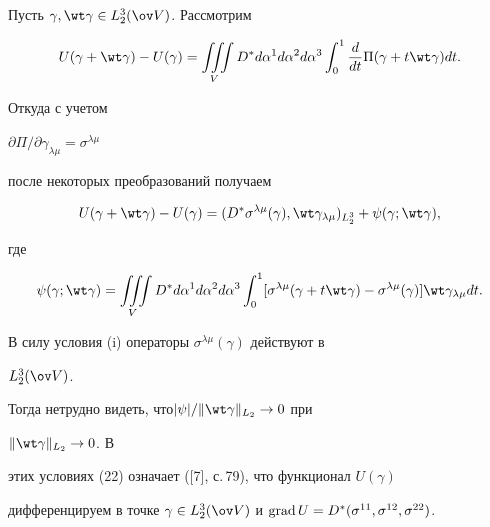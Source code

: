 \begin{pf} 


Пусть $\gamma,\wt\gamma\in L^3_2(\ov V)$. Рассмотрим 


$$ 


U(\gamma+\wt\gamma)-U(\gamma)=\iiint\limits_V 


D^* d\alpha^1d\alpha^2d\alpha^3 \int^1_0\frac{d}{d t} 


\Pi(\gamma+t\wt\gamma)d t. 


$$ 


Откуда с учетом 


$\partial\Pi/\partial\gamma_{\lambda\mu}=\sigma^{\lambda\mu}$ 


после некоторых преобразований получаем 


\begin{equation} 


U(\gamma+\wt\gamma)-U(\gamma)=(D^*\sigma^{\lambda\mu}(\gamma), 


\wt\gamma_{\lambda\mu})_{L^3_2}+\psi(\gamma;\wt\gamma), 


\end{equation} 


где 


$$ 


\psi(\gamma;\wt\gamma)=\iiint\limits_V 


D^* d\alpha^1d\alpha^2d\alpha^3 \int^1_0 


[\sigma^{\lambda\mu}(\gamma+t\wt \gamma)- 


\sigma^{\lambda\mu}(\gamma)]\wt\gamma_{\lambda\mu}d t. 


$$ 


В силу условия (i) операторы $\sigma^{\lambda\mu}(\gamma)$ действуют в 


$L^3_2(\ov V)$. 


Тогда нетрудно видеть, что\linebreak $|\psi|/\|\wt\gamma\|_{L_2}\to0$ при 


$\|\wt\gamma\|_{L_2}\to0$. В 


этих условиях (22) означает ([7], с.\,79), что функционал $U(\gamma)$ 


дифференцируем в точке $\gamma\in L^3_2(\ov V)$ и $\grad 


U=D^*(\sigma^{11},\sigma^{12},\sigma^{22})$. 


\end{pf} 


 


